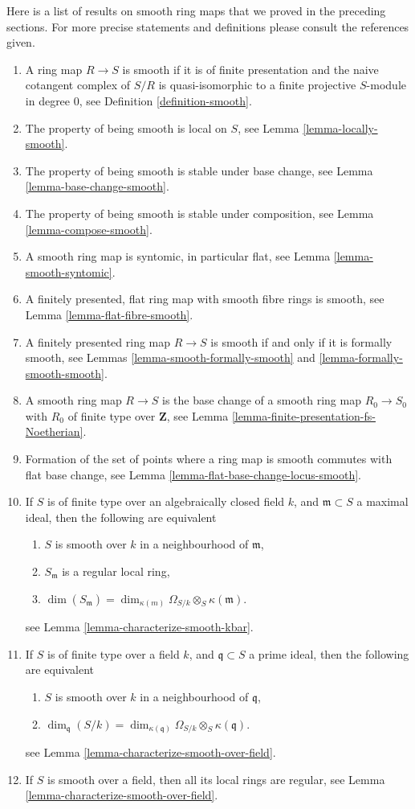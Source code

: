 \noindent
Here is a list of results on smooth ring maps that we
proved in the preceding sections. For more precise statements
and definitions please consult the references given.
\begin{enumerate}
\item A ring map $R \to S$ is smooth if it is of finite presentation
and the naive cotangent complex of $S/R$ is quasi-isomorphic to
a finite projective $S$-module in degree $0$, see
Definition \ref{definition-smooth}.
\item The property of being smooth is local on $S$, see
Lemma \ref{lemma-locally-smooth}.
\item The property of being smooth is stable under base change, see
Lemma \ref{lemma-base-change-smooth}.
\item The property of being smooth is stable under composition, see
Lemma \ref{lemma-compose-smooth}.
\item A smooth ring map is syntomic, in particular flat, see
Lemma \ref{lemma-smooth-syntomic}.
\item A finitely presented, flat ring map with smooth fibre rings
is smooth, see Lemma \ref{lemma-flat-fibre-smooth}.
\item A finitely presented ring map $R \to S$ is smooth if and
only if it is formally smooth, see
Lemmas \ref{lemma-smooth-formally-smooth} and
\ref{lemma-formally-smooth-smooth}.
\item A smooth ring map $R \to S$ is the base change
of a smooth ring map $R_0 \to S_0$
with $R_0$ of finite type over $\mathbf{Z}$, see
Lemma \ref{lemma-finite-presentation-fs-Noetherian}.
\item Formation of the set of points where a
ring map is smooth commutes with flat base change, see
Lemma \ref{lemma-flat-base-change-locus-smooth}.
\item If $S$ is of finite type over an algebraically closed
field $k$, and $\mathfrak m \subset S$ a maximal ideal,
then the following are equivalent
\begin{enumerate}
\item $S$ is smooth over $k$ in a neighbourhood of $\mathfrak m$,
\item $S_{\mathfrak m}$ is a regular local ring,
\item $\dim(S_{\mathfrak m}) =
\dim_{\kappa(m)} \Omega_{S/k} \otimes_S \kappa(\mathfrak m)$.
\end{enumerate}
see Lemma \ref{lemma-characterize-smooth-kbar}.
\item If $S$ is of finite type over a field $k$, and
$\mathfrak q \subset S$ a prime ideal,
then the following are equivalent
\begin{enumerate}
\item $S$ is smooth over $k$ in a neighbourhood of $\mathfrak q$,
\item $\dim_{\mathfrak q}(S/k) =
\dim_{\kappa(\mathfrak q)} \Omega_{S/k} \otimes_S \kappa(\mathfrak q)$.
\end{enumerate}
see Lemma \ref{lemma-characterize-smooth-over-field}.
\item If $S$ is smooth over a field, then all its local rings are
regular, see Lemma \ref{lemma-characterize-smooth-over-field}.
\end{enumerate}
